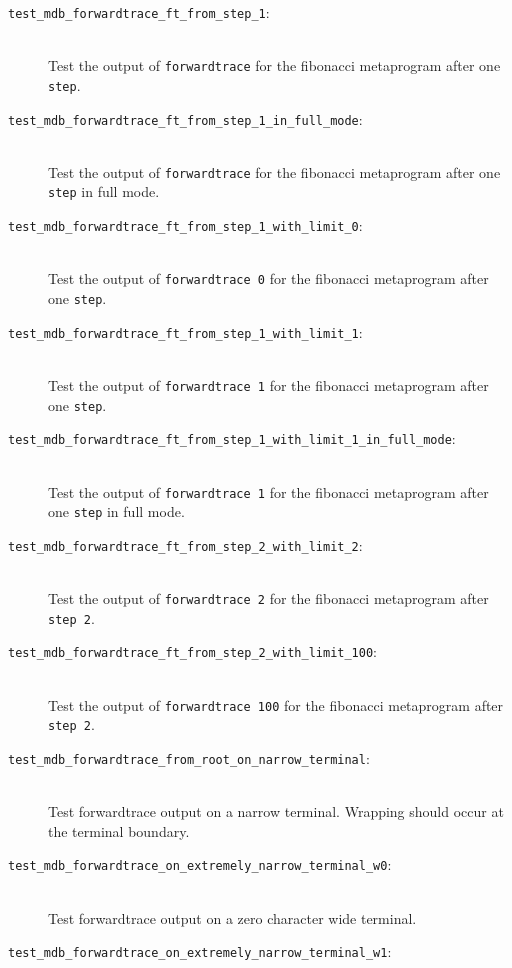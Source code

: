 \begin{description}
    \item[\texttt{test\_mdb\_forwardtrace\_ft\_from\_step\_1}:] \hfill \\
        Test the output of \texttt{forwardtrace} for the fibonacci metaprogram
        after one \texttt{step}.
    \item[\texttt{test\_mdb\_forwardtrace\_ft\_from\_step\_1\_in\_full\_mode}:] \hfill \\
        Test the output of \texttt{forwardtrace} for the fibonacci metaprogram
        after one \texttt{step} in full mode.
    \item[\texttt{test\_mdb\_forwardtrace\_ft\_from\_step\_1\_with\_limit\_0}:] \hfill \\
        Test the output of \texttt{forwardtrace 0} for the fibonacci
        metaprogram after one \texttt{step}.
    \item[\texttt{test\_mdb\_forwardtrace\_ft\_from\_step\_1\_with\_limit\_1}:] \hfill \\
        Test the output of \texttt{forwardtrace 1} for the fibonacci
        metaprogram after one \texttt{step}.
    \item[\texttt{test\_mdb\_forwardtrace\_ft\_from\_step\_1\_with\_limit\_1\_in\_full\_mode}:] \hfill \\
        Test the output of \texttt{forwardtrace 1} for the fibonacci
        metaprogram after one \texttt{step} in full mode.
    \item[\texttt{test\_mdb\_forwardtrace\_ft\_from\_step\_2\_with\_limit\_2}:] \hfill \\
        Test the output of \texttt{forwardtrace 2} for the fibonacci
        metaprogram after \texttt{step 2}.
    \item[\texttt{test\_mdb\_forwardtrace\_ft\_from\_step\_2\_with\_limit\_100}:] \hfill \\
        Test the output of \texttt{forwardtrace 100} for the fibonacci
        metaprogram after \texttt{step 2}.
    \item[\texttt{test\_mdb\_forwardtrace\_from\_root\_on\_narrow\_terminal}:] \hfill \\
        Test forwardtrace output on a narrow terminal. Wrapping should occur
        at the terminal boundary.
    \item[\texttt{test\_mdb\_forwardtrace\_on\_extremely\_narrow\_terminal\_w0}:] \hfill \\
        Test forwardtrace output on a zero character wide terminal.
    \item[\texttt{test\_mdb\_forwardtrace\_on\_extremely\_narrow\_terminal\_w1}:] \hfill \\

\end{description}
